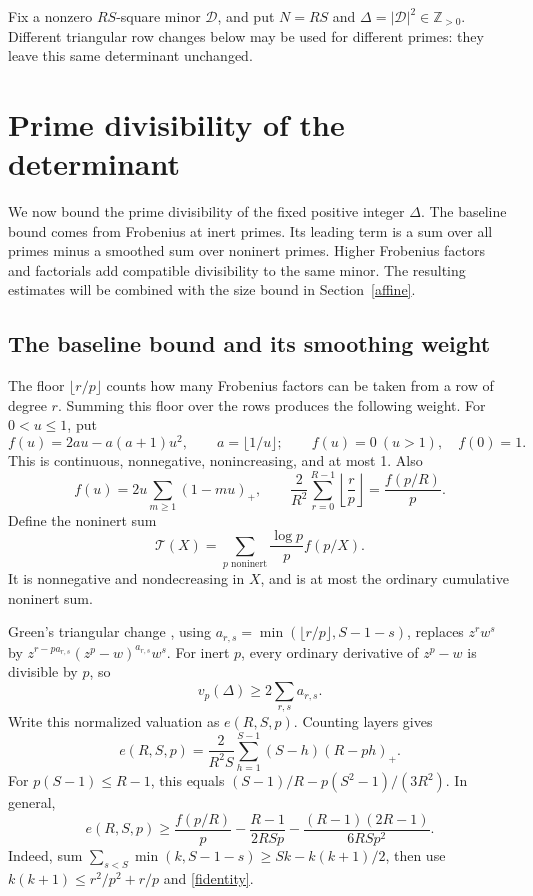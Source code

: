 \documentclass[11pt]{article}
\newcommand{\Z}{\mathbb Z}
\newcommand{\Tn}{\mathcal T}
\begin{document}
Fix a nonzero \(RS\)-square minor \(\mathcal D\), and put
\(N=RS\) and \(\Delta=|\mathcal D|^2\in\Z_{>0}\).
Different triangular row changes below may be used for different
primes: they leave this same determinant unchanged.

\section{Prime divisibility of the determinant}\label{divisibility}
We now bound the prime divisibility of the fixed positive integer
\(\Delta\). The baseline bound comes from Frobenius at inert primes.
Its leading term is a sum over all primes minus a smoothed sum over
noninert primes. Higher Frobenius factors and factorials add compatible
divisibility to the same minor. The resulting estimates will be combined
with the size bound in Section~\ref{affine}.

\subsection{The baseline bound and its smoothing weight}
The floor \(\lfloor r/p\rfloor\) counts how many Frobenius factors
can be taken from a row of degree \(r\). Summing this floor over the
rows produces the following weight.
For \(0<u\le1\), put
\begin{equation}\label{fdef}
 f(u)=2au-a(a+1)u^2,\qquad a=\lfloor1/u\rfloor;
 \qquad f(u)=0\ (u>1),\quad f(0)=1.
\end{equation}
This is continuous, nonnegative, nonincreasing, and at most 1. Also
\begin{equation}\label{fidentity}
 f(u)=2u\sum_{m\ge1}(1-mu)_+,\qquad
 \frac2{R^2}\sum_{r=0}^{R-1}\left\lfloor\frac rp\right\rfloor
       =\frac{f(p/R)}p.
\end{equation}
Define the noninert sum
\begin{equation}\label{Tdef}
 \Tn(X)=\sum_{p\text{ noninert}}\frac{\log p}{p}f(p/X).
\end{equation}
It is nonnegative and nondecreasing in \(X\), and is at most the
ordinary cumulative noninert sum.

Green's triangular change \cite{green}, using
\(a_{r,s}=\min(\lfloor r/p\rfloor,S-1-s)\), replaces \(z^rw^s\) by
\(z^{r-pa_{r,s}}(z^p-w)^{a_{r,s}}w^s\). For inert \(p\), every
ordinary derivative of \(z^p-w\) is divisible by \(p\), so
\[
 v_p(\Delta)\ge2\sum_{r,s}a_{r,s}.
\]
Write this normalized valuation as \(e(R,S,p)\). Counting layers gives
\begin{equation}\label{elayers}
 e(R,S,p)=\frac2{R^2S}\sum_{h=1}^{S-1}(S-h)(R-ph)_+.
\end{equation}
For \(p(S-1)\le R-1\), this equals
\((S-1)/R-p(S^2-1)/(3R^2)\). In general,
\begin{equation}\label{etail}
 e(R,S,p)\ge\frac{f(p/R)}p
       -\frac{R-1}{2RSp}
       -\frac{(R-1)(2R-1)}{6RSp^2}.
\end{equation}
Indeed, sum
\(\sum_{s<S}\min(k,S-1-s)\ge Sk-k(k+1)/2\), then use
\(k(k+1)\le r^2/p^2+r/p\) and \eqref{fidentity}.
\end{document}
